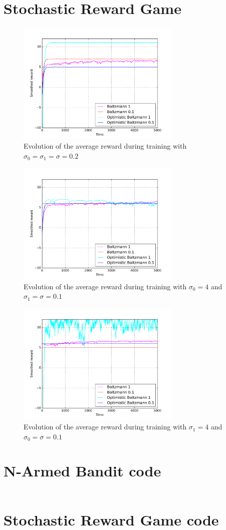 \documentclass[a4paper]{article}
\begin{document}
\section{Stochastic Reward Game}
\begin{figure}[H]
	\centering
	\includegraphics[width=0.7\textwidth]{./fig/ex2-0.pdf}
	\caption{Evolution of the average reward during training with 
		$\sigma_0 = \sigma_1 = \sigma = 0.2$}
	\label{ex31perf}
\end{figure}
\begin{figure}[H]
	\centering
	\includegraphics[width=0.7\textwidth]{./fig/ex2-1.pdf}
	\caption{Evolution of the average reward during training with
		$\sigma_0 = 4$ and $\sigma_1 = \sigma = 0.1$}
	\label{ex32perf}
\end{figure}
\begin{figure}[H]
	\centering
	\includegraphics[width=0.7\textwidth]{./fig/ex2-2.pdf}
	\caption{Evolution of the average reward during training with
		$\sigma_1 = 4$ and  $\sigma_0 = \sigma = 0.1$}
	\label{ex33perf}
\end{figure}

\appendix
\section{N-Armed Bandit code}
\inputminted{python}{partone.py}

\section{Stochastic Reward Game code}
\inputminted{python}{parttwo.py}
\end{document}
